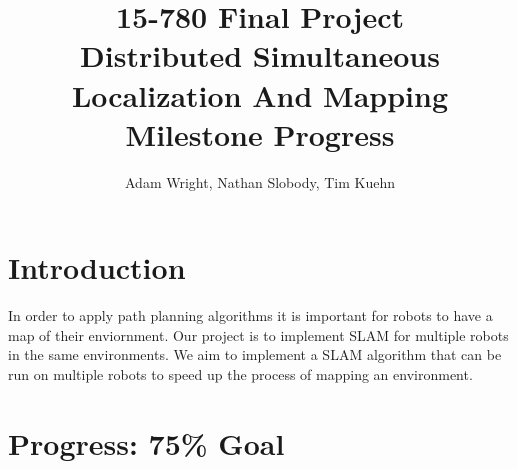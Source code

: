 \documentclass[11pt]{article}
\title{
15-780 Final Project \\ 
Distributed Simultaneous Localization And Mapping \\
Milestone Progress
}
\author{Adam Wright, Nathan Slobody, Tim Kuehn}
\begin{document}
\maketitle

\section{Introduction}

In order to apply path planning algorithms it is important for robots to have a map of their enviornment. Our project is to implement SLAM for multiple robots in the same environments. We aim to implement a SLAM algorithm that can be run on multiple robots to speed up the process of mapping an environment. 

\section{Progress: 75\% Goal}
\end{document}
